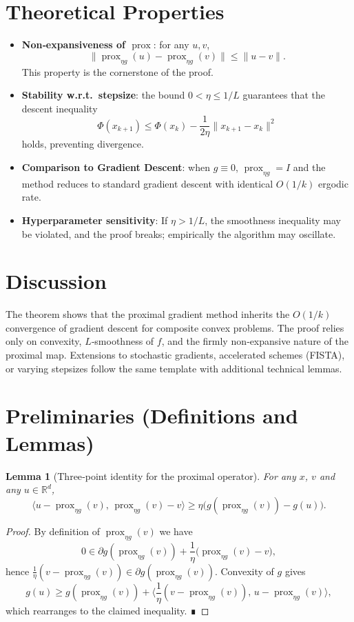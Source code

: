 \documentclass{article}
\newtheorem{lemma}{Lemma}
\newcommand{\prox}{\operatorname{prox}}
\begin{document}
\section*{Theoretical Properties}
\begin{itemize}[noitemsep]
    \item \textbf{Non‑expansiveness of $\prox$}: for any $u,v$,
          \[
          \|\prox_{\eta g}(u)-\prox_{\eta g}(v)\|\le\|u-v\|.
          \tag{NE}
          \]
          This property is the cornerstone of the proof.
    \item \textbf{Stability w.r.t.\ stepsize}: the bound $0<\eta\le1/L$ guarantees that the descent inequality
          \[
          \Phi(x_{k+1})\le \Phi(x_k)-\frac{1}{2\eta}\|x_{k+1}-x_k\|^2
          \]
          holds, preventing divergence.
    \item \textbf{Comparison to Gradient Descent}: when $g\equiv0$, $\prox_{\eta g}=I$ and the method reduces to standard gradient descent with identical $O(1/k)$ ergodic rate.
    \item \textbf{Hyperparameter sensitivity}: If $\eta>1/L$, the smoothness inequality may be violated, and the proof breaks; empirically the algorithm may oscillate.
\end{itemize}

\section*{Discussion}
The theorem shows that the proximal gradient method inherits the $O(1/k)$ convergence of gradient descent for composite convex problems. The proof relies only on convexity, $L$‑smoothness of $f$, and the firmly non‑expansive nature of the proximal map. Extensions to stochastic gradients, accelerated schemes (FISTA), or varying stepsizes follow the same template with additional technical lemmas.

\newpage

\section*{Preliminaries (Definitions and Lemmas)}
\begin{lemma}[Three‑point identity for the proximal operator]\label{lem:threepoint}
For any $x$, $v$ and any $u\in\mathbb{R}^d$,
\[
\langle u-\prox_{\eta g}(v),\,\prox_{\eta g}(v)-v\rangle
\ge \eta\big(g(\prox_{\eta g}(v))-g(u)\big).
\]
\end{lemma}
\begin{proof}
By definition of $\prox_{\eta g}(v)$ we have
\[
0\in \partial g(\prox_{\eta g}(v))+\frac{1}{\eta}\big(\prox_{\eta g}(v)-v\big),
\]
hence $\frac{1}{\eta}(v-\prox_{\eta g}(v))\in\partial g(\prox_{\eta g}(v))$.
Convexity of $g$ gives
\[
g(u)\ge g(\prox_{\eta g}(v))+\Big\langle \frac{1}{\eta}(v-\prox_{\eta g}(v)),\,u-\prox_{\eta g}(v)\Big\rangle,
\]
which rearranges to the claimed inequality. ∎
\end{proof}
\end{document}
